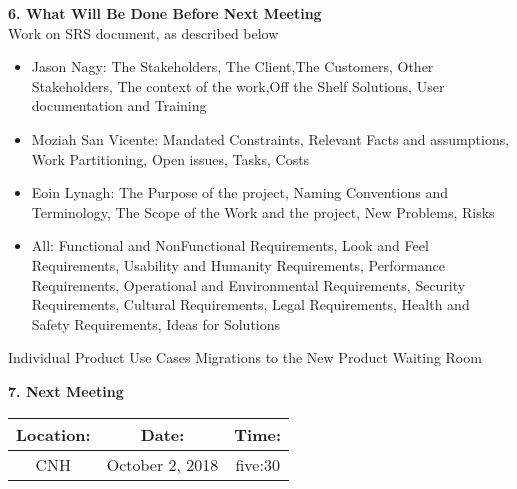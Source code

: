 \documentclass[12pt]{article}
\begin{document}
\begin{flushleft}
\textbf{6. What Will Be Done Before Next Meeting}\\
Work on SRS document, as described below\\
\begin{itemize}
\item Jason Nagy: The Stakeholders, The Client,The Customers, Other Stakeholders, The context of the work,Off the Shelf Solutions, User documentation and Training\\
\item Moziah San Vicente: Mandated Constraints, Relevant Facts and assumptions, Work Partitioning, Open issues, Tasks, Costs\\
\item Eoin Lynagh: The Purpose of the project, Naming Conventions and Terminology, The Scope of the Work and the project, New Problems, Risks\\
\item All: Functional and NonFunctional Requirements, Look and Feel Requirements, Usability and Humanity Requirements, Performance Requirements, Operational and Environmental Requirements, Security Requirements, Cultural Requirements, Legal Requirements, Health and Safety Requirements, Ideas for Solutions
\end{itemize}

Individual Product Use Cases
Migrations to the New Product
Waiting Room


\textbf{7. Next Meeting}\\
\begin{center}
 \begin{tabular}{|c | c | c |}
\hline
 Location: & Date: & Time: \\
 \hline
 CNH & October 2, 2018 & five:30\\
\hline
\end{tabular}
\end{center}

\end{flushleft}
\end{document}
